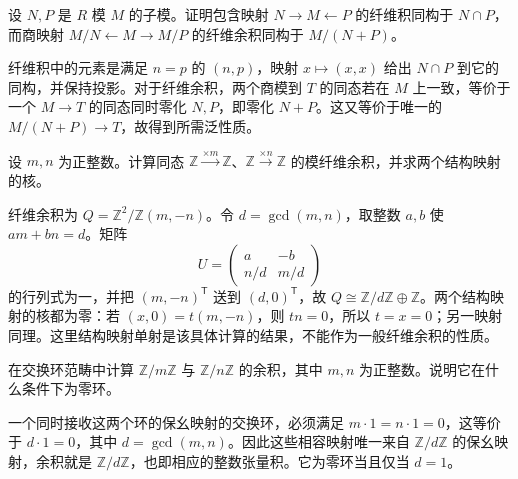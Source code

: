\begin{exercise}\label{b4:ex:02-pullback-intersection}
	设 \(N,P\) 是 \(R\) 模 \(M\) 的子模。证明包含映射 \(N\rightarrow M\leftarrow P\) 的纤维积同构于 \(N\cap P\)，而商映射 \(M/N\leftarrow M\rightarrow M/P\) 的纤维余积同构于 \(M/(N+P)\)。
\end{exercise}
\begin{solution}
	纤维积中的元素是满足 \(n=p\) 的 \((n,p)\)，映射 \(x\mapsto(x,x)\) 给出 \(N\cap P\) 到它的同构，并保持投影。对于纤维余积，两个商模到 \(T\) 的同态若在 \(M\) 上一致，等价于一个 \(M\rightarrow T\) 的同态同时零化 \(N,P\)，即零化 \(N+P\)。这又等价于唯一的 \(M/(N+P)\rightarrow T\)，故得到所需泛性质。
\end{solution}

\begin{exercise}\label{b4:ex:02-integer-pushout}
	设 \(m,n\) 为正整数。计算同态 \(\mathbb Z\xrightarrow{\times m}\mathbb Z\)、\(\mathbb Z\xrightarrow{\times n}\mathbb Z\) 的模纤维余积，并求两个结构映射的核。
\end{exercise}
\begin{solution}
	纤维余积为 \(Q=\mathbb Z^2/\mathbb Z(m,-n)\)。令 \(d=\gcd(m,n)\)，取整数 \(a,b\) 使 \(am+bn=d\)。矩阵
	\[
		U=\begin{pmatrix}a&-b\\ n/d&m/d\end{pmatrix}
	\]
	的行列式为一，并把 \((m,-n)^{\mathsf T}\) 送到 \((d,0)^{\mathsf T}\)，故 \(Q\cong\mathbb Z/d\mathbb Z\oplus\mathbb Z\)。两个结构映射的核都为零：若 \((x,0)=t(m,-n)\)，则 \(tn=0\)，所以 \(t=x=0\)；另一映射同理。这里结构映射单射是该具体计算的结果，不能作为一般纤维余积的性质。
\end{solution}

\begin{exercise}\label{b4:ex:02-ring-coproduct}
	在交换环范畴中计算 \(\mathbb Z/m\mathbb Z\) 与 \(\mathbb Z/n\mathbb Z\) 的余积，其中 \(m,n\) 为正整数。说明它在什么条件下为零环。
\end{exercise}
\begin{solution}
	一个同时接收这两个环的保幺映射的交换环，必须满足 \(m\cdot1=n\cdot1=0\)，这等价于 \(d\cdot1=0\)，其中 \(d=\gcd(m,n)\)。因此这些相容映射唯一来自 \(\mathbb Z/d\mathbb Z\) 的保幺映射，余积就是 \(\mathbb Z/d\mathbb Z\)，也即相应的整数张量积。它为零环当且仅当 \(d=1\)。
\end{solution}

